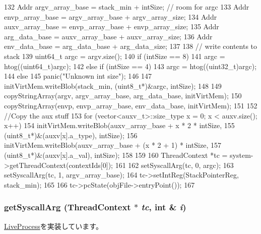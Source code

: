\begin{DoxyCode}
{132     Addr argv_array_base = stack_min + intSize; // room for argc
133     Addr envp_array_base = argv_array_base + argv_array_size;
134     Addr auxv_array_base = envp_array_base + envp_array_size;
135     Addr arg_data_base = auxv_array_base + auxv_array_size;
136     Addr env_data_base = arg_data_base + arg_data_size;
137 
138     // write contents to stack
139     uint64_t argc = argv.size();
140     if (intSize == 8)
141         argc = htog((uint64_t)argc);
142     else if (intSize == 4)
143         argc = htog((uint32_t)argc);
144     else
145         panic("Unknown int size");
146 
147     initVirtMem.writeBlob(stack_min, (uint8_t*)&argc, intSize);
148 
149     copyStringArray(argv, argv_array_base, arg_data_base, initVirtMem);
150     copyStringArray(envp, envp_array_base, env_data_base, initVirtMem);
151 
152     //Copy the aux stuff
153     for (vector<auxv_t>::size_type x = 0; x < auxv.size(); x++) {
154         initVirtMem.writeBlob(auxv_array_base + x * 2 * intSize,
155                 (uint8_t*)&(auxv[x].a_type), intSize);
156         initVirtMem.writeBlob(auxv_array_base + (x * 2 + 1) * intSize,
157                 (uint8_t*)&(auxv[x].a_val), intSize);
158     }
159 
160     ThreadContext *tc = system->getThreadContext(contextIds[0]);
161 
162     setSyscallArg(tc, 0, argc);
163     setSyscallArg(tc, 1, argv_array_base);
164     tc->setIntReg(StackPointerReg, stack_min);
165 
166     tc->pcState(objFile->entryPoint());
167 }
\end{DoxyCode}
\hypertarget{classAlphaLiveProcess_afcdc0ffa30f2ddff7b435be15da7a6af}{
\subsubsection[{getSyscallArg}]{ getSyscallArg ({\bf ThreadContext} $\ast$ {\em tc}, \/  int \& {\em i})}}
\label{classAlphaLiveProcess_afcdc0ffa30f2ddff7b435be15da7a6af}


\hyperlink{classLiveProcess_aa001ff57ec460026facb89ba19c7bf96}{LiveProcess}を実装しています。


